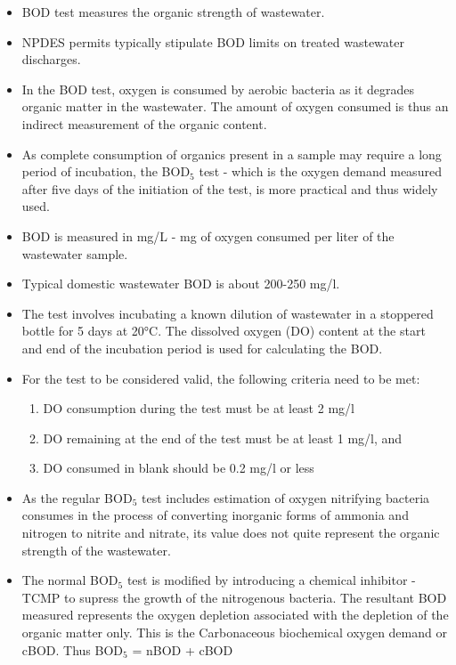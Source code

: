 			      	\begin{itemize}
			      		\item BOD test measures the organic strength of wastewater.
			      		\item NPDES permits typically stipulate BOD limits on treated wastewater discharges.
			      		\item In the BOD test, oxygen is consumed by aerobic bacteria as it degrades organic matter in the wastewater. The amount of oxygen consumed is thus an indirect measurement of the organic content.
			      		\item  As complete consumption of organics present in a sample may require a long period of incubation, the BOD$_5$ test - which is the oxygen demand measured after five days of the initiation of the test, is more practical and thus widely used.
			      		\item BOD is measured in mg/L - mg of oxygen consumed per liter of the wastewater sample.
			      		\item Typical domestic wastewater BOD is about 200-250 mg/l.     		
			      		\item The test involves incubating a known dilution of wastewater in a stoppered bottle for 5 days at 20\si{\degree}C.  The dissolved oxygen (DO) content at the start and end of the incubation period is used for calculating the BOD.
			      		\item For the test to be considered valid, the following criteria need to be met: 
			      		\begin{enumerate}
			      		\item DO consumption during the test must be at least 2 mg/l
			      		\item DO remaining at the end of the test must be at least 1 mg/l, and 
			      		\item DO consumed in blank should be 0.2 mg/l or less
			      		\end{enumerate}      			
			      		
						\item As the regular BOD$_5$ test includes estimation of oxygen nitrifying bacteria consumes in the process of converting inorganic forms of ammonia and nitrogen to nitrite and nitrate, its value does not quite represent the organic strength of the wastewater. 
						\item The normal BOD$_5$ test is modified by introducing a chemical inhibitor - TCMP to supress the growth of the nitrogenous bacteria.  The resultant BOD measured represents the oxygen depletion associated with the depletion of the organic matter only.  This is the Carbonaceous biochemical oxygen demand or cBOD.  Thus BOD$_5$ = nBOD + cBOD
			      		

\end{itemize}
